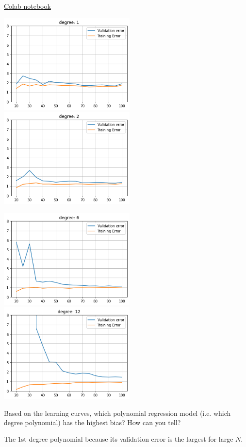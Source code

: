 \begin{solution}
  \href{https://colab.research.google.com/drive/1FbOzzcEizYxmaTfUKiRtui__baBd6Ksw?usp=sharing}{Colab notebook}

  \includegraphics[height=5cm]{images/2b_deg1.png}
  \includegraphics[height=5cm]{images/2b_deg2.png}

  \includegraphics[height=5cm]{images/2b_deg6.png}
  \includegraphics[height=5cm]{images/2b_deg12.png}
\end{solution}
\begin{problem}[3]
  Based on the learning curves, which polynomial regression model (i.e. which degree polynomial) has the highest bias? How can you tell?
\end{problem}
\begin{solution}
  The 1st degree polynomial because its validation error is the largest for large $N$.
\end{solution}

